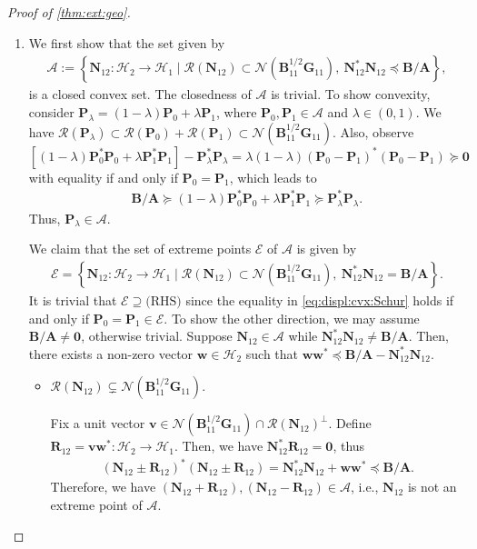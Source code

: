 \documentclass[noinfoline]{imsart}\setcounter{tocdepth}{2}
\newcommand{\m}[1]{\mathbf{#1}} %
\renewcommand{\c}[1]{\mathcal{#1}} %
\theoremstyle{plain}
\begin{document}
\begin{proof}[Proof of \cref{thm:ext:geo}] \quad
\begin{enumerate}[leftmargin = *]
\item We first show that the set given by
\begin{align*}
    \c{A} := \left\{\m{N}_{12}  : \c{H}_{2} \to \c{H}_{1} \mid \c{R}(\m{N}_{12}) \subset \c{N}(\m{B}_{11}^{1/2} \m{G}_{11}), \ \m{N}_{12}^{*} \m{N}_{12} \preceq \m{B}/\m{A} \right\},
\end{align*}
is a closed convex set. The closedness of $\c{A}$ is trivial. To show convexity, consider $\m{P}_{\lambda} = (1-\lambda) \m{P}_{0} + \lambda \m{P}_{1}$, where $\m{P}_{0}, \m{P}_{1} \in \c{A}$ and $\lambda \in (0, 1)$. We have $\c{R}(\m{P}_{\lambda}) \subset \c{R}(\m{P}_{0}) + \c{R}(\m{P}_{1}) \subset \c{N}(\m{B}_{11}^{1/2} \m{G}_{11})$. Also, observe $[(1-\lambda) \m{P}_{0}^{*} \m{P}_{0} + \lambda \m{P}_{1}^{*} \m{P}_{1}] - \m{P}_{\lambda}^{*} \m{P}_{\lambda} = \lambda (1 - \lambda) (\m{P}_{0} - \m{P}_{1})^{*} (\m{P}_{0} - \m{P}_{1}) \succeq \m{0}$ with equality if and only if $\m{P}_{0} = \m{P}_{1}$, which leads to
\begin{align}\label{eq:displ:cvx:Schur}
    \m{B}/\m{A} \succeq (1-\lambda) \m{P}_{0}^{*} \m{P}_{0} + \lambda \m{P}_{1}^{*} \m{P}_{1} \succeq \m{P}_{\lambda}^{*} \m{P}_{\lambda}.
\end{align}
Thus, $\m{P}_{\lambda} \in \c{A}$. 

We claim that the set of extreme points $\c{E}$ of $\c{A}$ is given by 
\begin{align*}
    \c{E} = \left\{\m{N}_{12}  : \c{H}_{2} \to \c{H}_{1} \mid \c{R}(\m{N}_{12}) \subset \c{N}(\m{B}_{11}^{1/2} \m{G}_{11}), \ \m{N}_{12}^{*} \m{N}_{12} = \m{B}/\m{A} \right\}.
\end{align*}
It is trivial that $\c{E} \supseteq \text{(RHS)}$ since the equality in \eqref{eq:displ:cvx:Schur} holds if and only if $\m{P}_{0} = \m{P}_{1} \in \c{E}$.
To show the other direction, we may assume $\m{B}/\m{A} \ne \m{0}$, otherwise trivial. Suppose $\m{N}_{12} \in \c{A}$ while $\m{N}_{12}^{*} \m{N}_{12} \ne \m{B}/\m{A}$. Then, there exists a non-zero vector $\m{w} \in \c{H}_{2}$ such that $\m{w} \m{w}^{*} \preceq \m{B}/\m{A} - \m{N}_{12}^{*} \m{N}_{12}$.

\begin{itemize}
\item [(Case 1)] \underline{$\c{R}(\m{N}_{12}) \subsetneq \c{N}(\m{B}_{11}^{1/2} \m{G}_{11})$}. 

Fix a unit vector $\m{v} \in \c{N}(\m{B}_{11}^{1/2} \m{G}_{11}) \cap \c{R}(\m{N}_{12})^{\perp}$. Define $\m{R}_{12} = \m{v} \m{w}^{*} : \c{H}_{2} \to \c{H}_{1}$. Then, we have $\m{N}_{12}^{*} \m{R}_{12} = \m{0}$, thus
\begin{align*}
    (\m{N}_{12} \pm \m{R}_{12})^{*} (\m{N}_{12} \pm \m{R}_{12}) = \m{N}_{12}^{*} \m{N}_{12} + \m{w} \m{w}^{*} \preceq \m{B}/\m{A}.
\end{align*}
Therefore, we have $(\m{N}_{12} + \m{R}_{12}), (\m{N}_{12} - \m{R}_{12}) \in \c{A}$, i.e., $\m{N}_{12}$ is not an extreme point of $\c{A}$.


\end{itemize}
\end{enumerate}
\end{proof}
\end{document}
